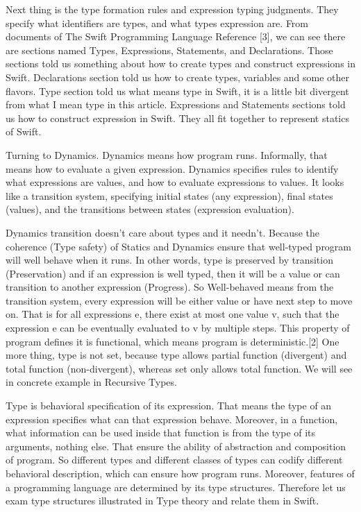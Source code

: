 \documentclass{article}
\begin{document}
Next thing is the type formation rules and expression typing judgments. They specify what identifiers are types, and what types expression are. From documents of The Swift Programming Language Reference [3], we can see there are sections named Types, Expressions, Statements, and Declarations. Those sections told us something about how to create types and construct expressions in Swift. Declarations section told us how to create types, variables and some other flavors. Type section told us what means type in Swift, it is a little bit divergent from what I mean type in this article. Expressions and Statements sections told us how to construct expression in Swift. They all fit together to represent statics of Swift.


Turning to Dynamics. Dynamics means how program runs. Informally, that means how to evaluate a given expression. Dynamics specifies rules to identify what expressions are values, and how to evaluate expressions to values. It looks like a transition system, specifying initial states (any expression), final states (values), and the transitions between states (expression evaluation).


Dynamics transition doesn’t care about types and it needn’t. Because the coherence (Type safety) of Statics and Dynamics ensure that well-typed program will well behave when it runs. In other words, type is preserved by transition (Preservation) and if an expression is well typed, then it will be a value or can transition to another expression (Progress). So Well-behaved means from the transition system, every expression will be either value or have next step to move on. That is for all expressions e, there exist at most one value v, such that the expression e can be eventually evaluated to v by multiple steps. This property of program defines it is functional, which means program is deterministic.[2] One more thing, type is not set, because type allows partial function (divergent) and total function (non-divergent), whereas set only allows total function. We will see in concrete example in Recursive Types. 


Type is behavioral specification of its expression. That means the type of an expression specifies what can that expression behave. Moreover, in a function, what information can be used inside that function is from the type of its arguments, nothing else. That ensure the ability of abstraction and composition of program. So different types and different classes of types can codify different behavioral description, which can ensure how program runs. Moreover, features of a programming language are determined by its type structures. Therefore let us exam type structures illustrated in Type theory and relate them in Swift.
\end{document}
